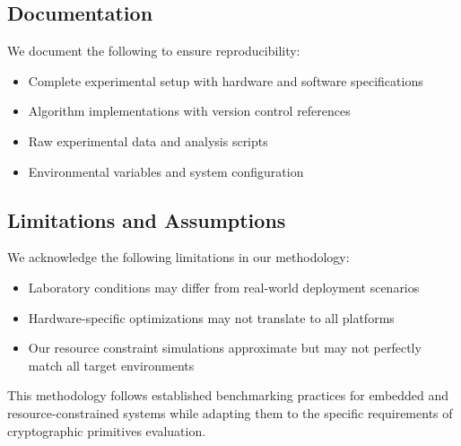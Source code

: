 \subsection{Documentation}
We document the following to ensure reproducibility:
\begin{itemize}
    \item Complete experimental setup with hardware and software specifications
    \item Algorithm implementations with version control references
    \item Raw experimental data and analysis scripts
    \item Environmental variables and system configuration
\end{itemize}

\subsection{Limitations and Assumptions}
We acknowledge the following limitations in our methodology:
\begin{itemize}
    \item Laboratory conditions may differ from real-world deployment scenarios
    \item Hardware-specific optimizations may not translate to all platforms
    \item Our resource constraint simulations approximate but may not perfectly match all target environments
\end{itemize}

This methodology follows established benchmarking practices for embedded and resource-constrained systems \cite{resource_constrained, embedded_benchmarking, energy_efficient} while adapting them to the specific requirements of cryptographic primitives evaluation. 